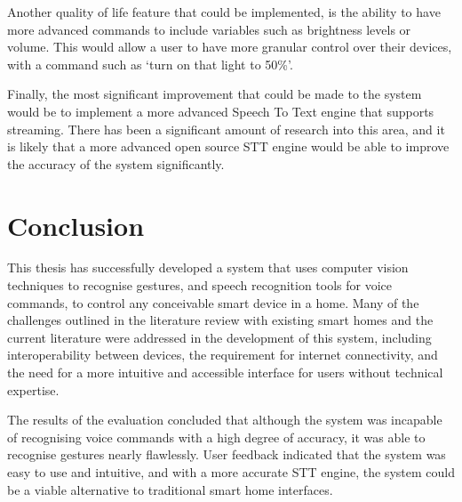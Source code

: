Another quality of life feature that could be implemented, is the ability to have more advanced commands to include variables such as brightness levels or volume.
This would allow a user to have more granular control over their devices, with a command such as `turn on that light to 50\%'.

Finally, the most significant improvement that could be made to the system would be to implement a more advanced Speech To Text engine that supports streaming.
There has been a significant amount of research into this area, and it is likely that a more advanced open source STT engine would be able to improve the accuracy of the system significantly.

\section{Conclusion}

This thesis has successfully developed a system that uses computer vision techniques to recognise gestures, and speech recognition tools for voice commands, to control any conceivable smart device in a home.
Many of the challenges outlined in the literature review with existing smart homes and the current literature were addressed in the development of this system, including interoperability between devices, the requirement for internet connectivity, and the need for a more intuitive and accessible interface for users without technical expertise.

The results of the evaluation concluded that although the system was incapable of recognising voice commands with a high degree of accuracy, it was able to recognise gestures nearly flawlessly.
User feedback indicated that the system was easy to use and intuitive, and with a more accurate STT engine, the system could be a viable alternative to traditional smart home interfaces.